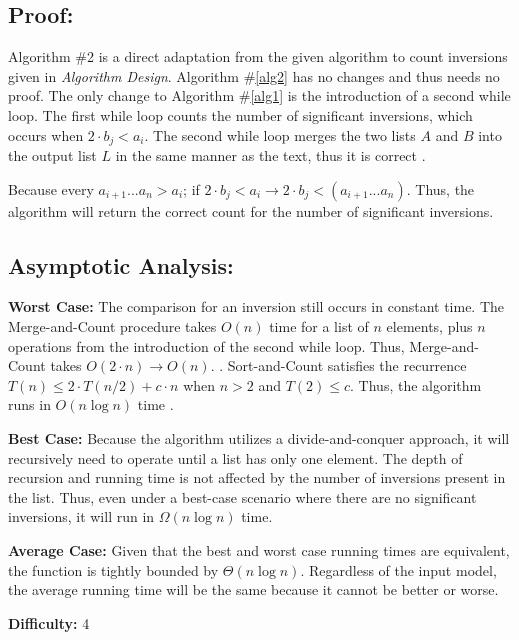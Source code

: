 \documentclass{article}
\begin{document}
\vspace{2 cm}
\subsection*{Proof:}
Algorithm \#2 is a direct adaptation from the given algorithm to count inversions given in \textit{Algorithm Design}.
Algorithm \#\ref{alg2} has no changes and thus needs no proof.  The only change to Algorithm \#\ref{alg1} is the introduction of a second while loop.  The first while loop counts the number of significant inversions, which occurs when $2 \cdot b_j < a_i$.  The second while loop merges the two lists $A$ and $B$ into the output list $L$ in the same manner as the text, thus it is correct \cite{algDesign}. \newline

\noindent Because every $a_{i + 1} ... a_n > a_i$; if $2 \cdot b_j < a_i \rightarrow 2 \cdot b_j < (a_{i + 1} ... a_n)$.
Thus, the algorithm will return the correct count for the number of significant inversions.

\subsection*{Asymptotic Analysis:}
\noindent \textbf{Worst Case:}
The comparison for an inversion still occurs in constant time.  The Merge-and-Count procedure takes $O(n)$ time for a list of $n$ elements, plus $n$ operations from the introduction of the second while loop.  Thus, Merge-and-Count takes $O(2 \cdot n) \rightarrow O(n)$. \cite{algDesign}.  
Sort-and-Count satisfies the recurrence $T(n) \leq 2 \cdot T(n/2) + c \cdot n$ when $n > 2$ and $T(2) \leq c$.
Thus, the algorithm runs in $O(n \log{n})$ time \cite{algDesign}. 

\noindent \textbf{Best Case:}
Because the algorithm utilizes a divide-and-conquer approach, it will recursively need to operate until a list has only one element.  The depth of recursion and running time is not affected by the number of inversions present in the list.  Thus, even under a best-case scenario where there are no significant inversions, it will run in $\Omega (n \log{n} )$ time.

\noindent \textbf{Average Case:}
Given that the best and worst case running times are equivalent, the function is tightly bounded by $\Theta ( n \log{n})$.  Regardless of the input model, the average running time will be the same because it cannot be better or worse.

\noindent \textbf{Difficulty:}  4
\end{document}
